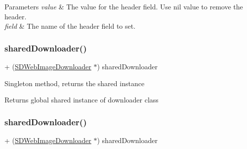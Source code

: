 \begin{DoxyParams}{Parameters}
{\em value} & The value for the header field. Use {\ttfamily nil} value to remove the header. \\
\hline
{\em field} & The name of the header field to set. \\
\hline
\end{DoxyParams}
\mbox{\label{interface_s_d_web_image_downloader_a3611251a4eebd50128610c79d48aadca}} 
\subsubsection{\texorpdfstring{shared\+Downloader()}{sharedDownloader()}\hspace{0.1cm}{\footnotesize\ttfamily [1/3]}}
{\footnotesize\ttfamily + (\mbox{\hyperlink{interface_s_d_web_image_downloader}{S\+D\+Web\+Image\+Downloader}} $\ast$) shared\+Downloader \begin{DoxyParamCaption}{ }\end{DoxyParamCaption}}

Singleton method, returns the shared instance

\begin{DoxyReturn}{Returns}
global shared instance of downloader class 
\end{DoxyReturn}
\mbox{\label{interface_s_d_web_image_downloader_a3611251a4eebd50128610c79d48aadca}} 
\subsubsection{\texorpdfstring{shared\+Downloader()}{sharedDownloader()}\hspace{0.1cm}{\footnotesize\ttfamily [2/3]}}
{\footnotesize\ttfamily + (\mbox{\hyperlink{interface_s_d_web_image_downloader}{S\+D\+Web\+Image\+Downloader}} $\ast$) shared\+Downloader \begin{DoxyParamCaption}{ }\end{DoxyParamCaption}}


